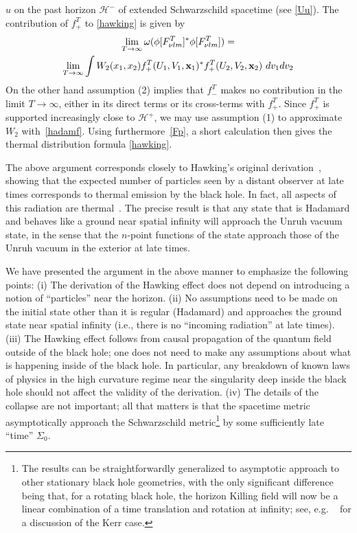 \documentclass[12pt]{article}
\theoremstyle{plain}
\theoremstyle{definition}
\begin{document}
$u$ on the past horizon ${\mathcal H}^-$ of extended Schwarzschild spacetime (see \eqref{Uu}).
The contribution of $f^T_+$ to
\eqref{hawking} is given by
\begin{multline}
\lim_{T \to \infty} \omega( \phi[F_{\nu lm}^T]^* \phi[F^T_{\nu l m}] ) = \\
\lim_{T \to \infty} \int
W_2(x_1, x_2) f^{T}_+(U_1,V_1, {\bf x}_1)^* f^{T}_+(U_2, V_2, {\bf x}_2) \ dv_1 dv_2
\end{multline}
On the other hand assumption (2) implies that $f_-^T$ makes no contribution
 in the limit $T \to \infty$, either in its direct terms or its cross-terms
with $f_+^T$.
Since $f_+^T$ is supported increasingly close to ${\mathcal H}^+$, we
may use assumption (1) to approximate $W_2$ with~\eqref{hadamf}. Using furthermore~\eqref{Fp}, 
a short calculation then gives the thermal distribution formula
\eqref{hawking}.

The above argument corresponds closely to Hawking's original derivation~\cite{hawking}, showing that the expected number of particles
seen by a distant observer at late times corresponds to thermal emission by the black hole. In fact, all aspects of
this radiation are thermal~\cite{wald}.  The precise result is that any state that is Hadamard and behaves like a ground near spatial infinity
will approach the Unruh vacuum state, in the sense that the $n$-point functions of the state approach those of
the Unruh vacuum in the exterior at late times.

We have presented the argument in the above manner to emphasize the following points: (i) The derivation of the Hawking effect does
not depend on introducing a notion of ``particles'' near the horizon. (ii) No assumptions need to be made on the initial state other than it is regular (Hadamard) and approaches the ground state near spatial infinity (i.e., there is no ``incoming radiation'' at late times). (iii) The Hawking effect follows from causal propagation of the quantum field outside of the black hole; one does not need to make any assumptions about what is happening inside of the black hole. In particular, any breakdown of known laws of physics in the high curvature regime near the singularity deep inside the black hole should not affect the validity of the derivation. (iv) The details of the collapse are not important; all that matters is that the spacetime metric asymptotically approach the Schwarzschild metric\footnote{The results can be straightforwardly generalized to asymptotic approach to other stationary black hole geometries, with the only significant difference being that, for a rotating black hole, the horizon Killing field will now be a linear combination of a time translation and rotation at infinity; see, e.g. ~\cite{hawking,wald} for a discussion of the Kerr case.} by some sufficiently late ``time'' $\Sigma_0$.
\end{document}
